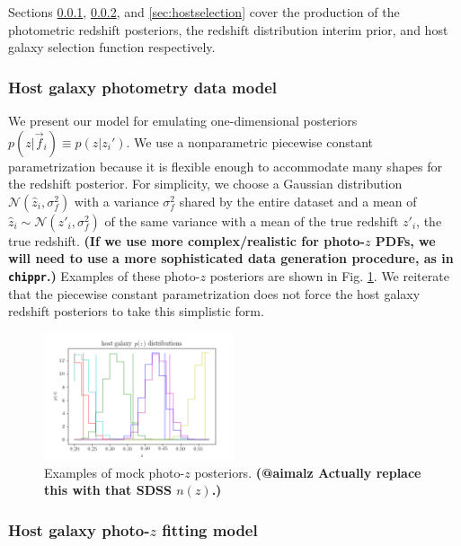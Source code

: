 \documentclass[12pt, twocolumn]{emulateapj}
\begin{document}
Sections \ref{sec:hostposterior}, \ref{sec:hostinterim}, and \ref{sec:hostselection} cover the production of the photometric redshift posteriors, the redshift distribution interim prior, and host galaxy selection function respectively.

\subsubsection{Host galaxy photometry data model}
\label{sec:hostposterior}

We present our model for emulating one-dimensional posteriors $p(z | \vec{f}_{i})\equiv p(z | z_{i}')$.  
We use a nonparametric piecewise constant parametrization because it is flexible enough to accommodate many shapes for the redshift posterior.  
For simplicity, we choose a Gaussian distribution $\mathcal{N}(\hat{z}_{i}, \sigma_{f}^{2})$ with a variance $\sigma_{f}^{2}$ shared by the entire dataset and a mean of $\hat{z}_{i}\sim \mathcal{N}(z'_{i}, \sigma_{f}^{2})$ of the same variance with a mean of the true redshift $z'_{i}$, the true redshift.  
\textbf{(If we use more complex/realistic for photo-$z$ PDFs, we will need to use a more sophisticated data generation procedure, as in \texttt{chippr}.)}  
Examples of these photo-$z$ posteriors are shown in Fig. \ref{fig:pzs}.  
We reiterate that the piecewise constant parametrization does not force the host galaxy redshift posteriors to take this simplistic form.

\begin{figure}
	\begin{center}
		\includegraphics[width=0.5\textwidth]{fig/host_pzs.png}
		\caption{Examples of mock photo-$z$ posteriors.  \textbf{(@aimalz Actually replace this with that SDSS $n(z)$.)}}
		\label{fig:pzs}
	\end{center}
\end{figure}

\subsubsection{Host galaxy photo-$z$ fitting model}
\label{sec:hostinterim}
\end{document}
